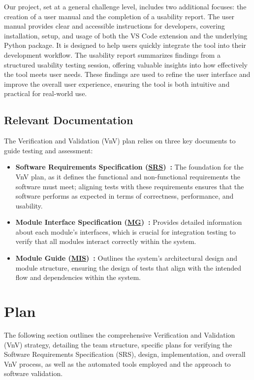 \documentclass[12pt, titlepage]{article}
\newcommand{\SRS}{\href{https://github.com/ssm-lab/capstone--source-code-optimizer/blob/main/docs/SRS/SRS.pdf}{SRS}}
\newcommand{\MG}{\href{https://github.com/ssm-lab/capstone--source-code-optimizer/blob/main/docs/Design/SoftArchitecture/MG.pdf}{MG}}
\newcommand{\MIS}{\href{https://github.com/ssm-lab/capstone--source-code-optimizer/blob/main/docs/Design/SoftDetailedDes/MIS.pdf}{MIS}}
\begin{document}
Our project, set at a general challenge level, includes two additional focuses: the creation of a user manual and the completion of a usability report. The user manual provides clear and accessible instructions for developers, covering installation, setup, and usage of both the VS Code extension and the underlying Python package. It is designed to help users quickly integrate the tool into their development workflow. The usability report summarizes findings from a structured usability testing session, offering valuable insights into how effectively the tool meets user needs. These findings are used to refine the user interface and improve the overall user experience, ensuring the tool is both intuitive and practical for real-world use.

\subsection{Relevant Documentation}

The Verification and Validation (VnV) plan relies on three key documents to guide testing and assessment:
\begin{itemize}
  \item[] \textbf{Software Requirements Specification
    (\SRS)~\cite{SRS}:} The foundation for the VnV plan, as it
    defines the functional and non-functional requirements the
    software must meet; aligning tests with these requirements
    ensures that the software performs as expected in terms of
    correctness, performance, and usability.

  \item[] \textbf{Module Interface Specification (\MG)~\cite{MGDoc}:}
    Provides detailed information about each module's interfaces,
    which is crucial for integration testing to verify that all
    modules interact correctly within the system.

  \item[] \textbf{Module Guide (\MIS)~\cite{MISDoc}:} Outlines the
    system's architectural design and module structure, ensuring the
    design of tests that align with the intended flow and
    dependencies within the system.
\end{itemize}

\newpage\section{Plan}

The following section outlines the comprehensive Verification and
Validation (VnV) strategy, detailing the team structure, specific
plans for verifying the Software Requirements Specification (SRS),
design, implementation, and overall VnV process, as well as the
automated tools employed and the approach to software validation.
\end{document}
